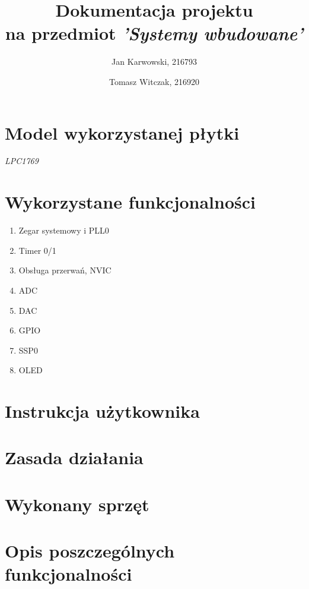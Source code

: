 ﻿\documentclass{article}
\author{
    Jan Karwowski, 216793
        \and
    Tomasz Witczak, 216920
}
\title{\textbf{Dokumentacja projektu}\\na przedmiot \textit{'Systemy wbudowane'}}
\begin{document}
\maketitle
\newpage

\section{Model wykorzystanej płytki}
    \textit{LPC1769}

\section{Wykorzystane funkcjonalności}
\begin{enumerate}
    \item Zegar systemowy i PLL0
    \item Timer 0/1
    \item Obsługa przerwań, NVIC
    \item ADC
    \item DAC
    \item GPIO
    \item SSP0
    \item OLED
\end{enumerate}

\section{Instrukcja użytkownika}
\label{instrukcja_uzytkownika}


\section{Zasada działania}
\label{zasada_dzialania}


\section{Wykonany sprzęt}
\label{wykonany_sprzet}


\section{Opis poszczególnych funkcjonalności}








\end{document}

